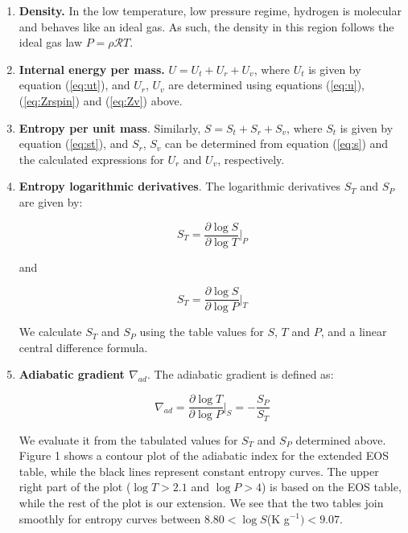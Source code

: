 \documentclass[apj]{emulateapj}
\begin{document}
\begin{enumerate}

\item{\textbf{Density.}} In the low temperature, low pressure regime, hydrogen is molecular and behaves like an ideal gas. As such, the density in this region follows the ideal gas law $P=\rho \mathcal{R} T$.
\item{\textbf{Internal energy per mass.}} $U=U_t+U_r+U_v$, where $U_t$ is given by equation (\ref{eq:ut}), and $U_r$, $U_v$ are determined using equations (\ref{eq:u}), (\ref{eq:Zrspin}) and (\ref{eq:Zv}) above.
\item{\textbf{Entropy per unit mass}}. Similarly, $S=S_t+S_r+S_v$, where $S_t$ is given by equation (\ref{eq:st}), and $S_r$, $S_v$ can be determined from equation (\ref{eq:s}) and the calculated expressions for $U_r$ and $U_v$, respectively.
\item{\textbf{Entropy logarithmic derivatives}}. The logarithmic derivatives $S_T$ and $S_P$ are given by:

\begin{equation}
\label{eq:sT}
S_T=\frac{\partial \log{S}}{\partial \log{T}} \Big |_P
\end{equation}

\noindent and

\begin{equation}
\label{eq:sP}
S_T=\frac{\partial \log{S}}{\partial \log{P}} \Big |_T
\end{equation}

We calculate $S_T$ and $S_P$ using the table values for $S$, $T$ and $P$, and a linear central difference formula. 

\item{\textbf{Adiabatic gradient $\nabla_{ad}$}}. The adiabatic gradient is defined as:

\begin{equation}
\label{eq:deladSP}
\nabla_{ad}=\frac{\partial \log{T}}{\partial \log{P}} \Big |_S = -\frac{S_P}{S_T}
\end{equation}

We evaluate it from the tabulated values for $S_T$ and $S_P$ determined above. Figure 1 shows a contour plot of the adiabatic index for the extended EOS table, while the black lines represent constant entropy curves. The upper right part of the plot ($\log T>2.1$ and $\log P>4$) is based on the \cite{saumon95} EOS table, while the rest of the plot is our extension. We see that the two tables join smoothly for entropy curves between $8.80<\log{S}$(K g$^{-1})<9.07$.

\end{enumerate}
\end{document}
